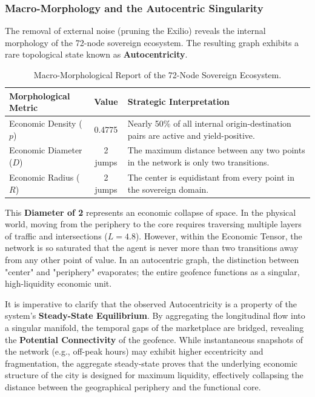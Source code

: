 \subsubsection{Macro-Morphology and the Autocentric Singularity}

The removal of external noise (pruning the Exilio) reveals the internal morphology of the 72-node sovereign ecosystem. The resulting graph exhibits a rare topological state known as \textbf{Autocentricity}.

\begin{table}[H]
    \centering
    \small
    \begin{tabularx}{\textwidth}{l c X}
        \toprule
        \textbf{Morphological Metric} & \textbf{Value} & \textbf{Strategic Interpretation} \\
        \midrule
        Economic Density ($p$) & 0.4775 & Nearly 50\% of all internal origin-destination pairs are active and yield-positive. \\
        \addlinespace
        Economic Diameter ($D$) & 2 jumps & The maximum distance between any two points in the network is only two transitions. \\
        \addlinespace
        Economic Radius ($R$) & 2 jumps & The center is equidistant from every point in the sovereign domain. \\
        \bottomrule
    \end{tabularx}
    \caption{Macro-Morphological Report of the 72-Node Sovereign Ecosystem.}
    \label{tab:morphology_report}
\end{table}

This \textbf{Diameter of 2} represents an economic collapse of space. In the physical world, moving from the periphery to the core requires traversing multiple layers of traffic and intersections ($L=4.8$). However, within the Economic Tensor, the network is so saturated that the agent is never more than two transitions away from any other point of value. In an autocentric graph, the distinction between "center" and "periphery" evaporates; the entire geofence functions as a singular, high-liquidity economic unit.

It is imperative to clarify that the observed Autocentricity is a property of the system's \textbf{Steady-State Equilibrium}. By aggregating the longitudinal flow into a singular manifold, the temporal gaps of the marketplace are bridged, revealing the \textbf{Potential Connectivity} of the geofence. While instantaneous snapshots of the network (e.g., off-peak hours) may exhibit higher eccentricity and fragmentation, the aggregate steady-state proves that the underlying economic structure of the city is designed for maximum liquidity, effectively collapsing the distance between the geographical periphery and the functional core.

